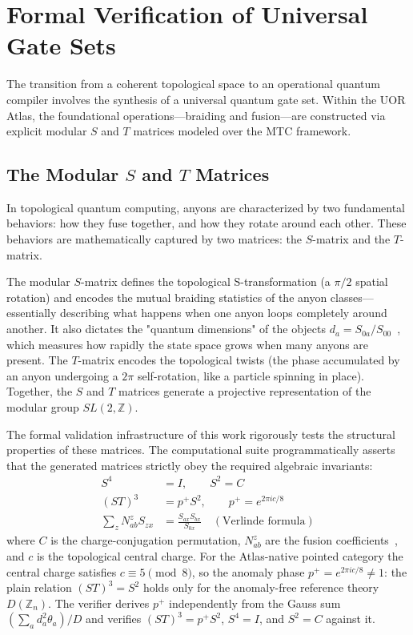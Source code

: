 \section{Formal Verification of Universal Gate Sets}

The transition from a coherent topological space to an operational quantum compiler involves the synthesis of a universal quantum gate set. Within the UOR Atlas, the foundational operations---braiding and fusion---are constructed via explicit modular $S$ and $T$ matrices modeled over the MTC framework.

\subsection{The Modular \texorpdfstring{$S$}{S} and \texorpdfstring{$T$}{T} Matrices}
In topological quantum computing, anyons are characterized by two fundamental behaviors: how they fuse together, and how they rotate around each other. These behaviors are mathematically captured by two matrices: the $S$-matrix and the $T$-matrix.

The modular $S$-matrix defines the topological S-transformation (a $\pi/2$ spatial rotation) and encodes the mutual braiding statistics of the anyon classes—essentially describing what happens when one anyon loops completely around another. It also dictates the "quantum dimensions" of the objects $d_a = S_{0a}/S_{00}$~\cite{rowell2009}, which measures how rapidly the state space grows when many anyons are present. The $T$-matrix encodes the topological twists (the phase accumulated by an anyon undergoing a $2\pi$ self-rotation, like a particle spinning in place). Together, the $S$ and $T$ matrices generate a projective representation of the modular group $SL(2, \mathbb{Z})$.

The formal validation infrastructure of this work rigorously tests the structural properties of these matrices. The computational suite programmatically asserts that the generated matrices strictly obey the required algebraic invariants:
\begin{align}
    S^4 &= I, \qquad S^2 = C \\
    {(ST)}^3 &= p^{+} S^2, \qquad p^{+} = e^{2\pi i c/8} \\
    \sum_z N_{ab}^z S_{zx} &= \frac{S_{ax}S_{bx}}{S_{0x}} \quad (\text{Verlinde formula})
\end{align}
where $C$ is the charge-conjugation permutation, $N_{ab}^z$ are the fusion coefficients~\cite{verlinde1988}, and $c$ is the topological central charge. For the Atlas-native pointed category the central charge satisfies $c \equiv 5 \pmod{8}$, so the anomaly phase $p^{+} = e^{2\pi i c/8} \neq 1$: the plain relation ${(ST)}^3 = S^2$ holds only for the anomaly-free reference theory $D(\mathbb{Z}_n)$. The verifier derives $p^{+}$ independently from the Gauss sum $(\sum_a d_a^2 \theta_a)/D$ and verifies ${(ST)}^3 = p^{+} S^2$, $S^4 = I$, and $S^2 = C$ against it.

